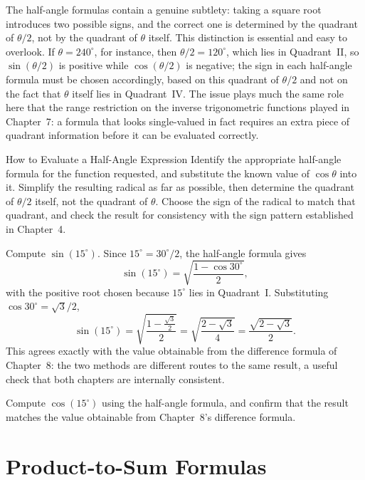 The half-angle formulas contain a genuine subtlety: taking a square root
introduces two possible signs, and the correct one is determined by the
quadrant of $\theta/2$, not by the quadrant of $\theta$ itself. This
distinction is essential and easy to overlook. If $\theta = 240^\circ$,
for instance, then $\theta/2 = 120^\circ$, which lies in Quadrant~II, so
$\sin(\theta/2)$ is positive while $\cos(\theta/2)$ is negative; the sign
in each half-angle formula must be chosen accordingly, based on this
quadrant of $\theta/2$ and not on the fact that $\theta$ itself lies in
Quadrant~IV. The issue plays much the same role here that the range
restriction on the inverse trigonometric functions played in Chapter~7:
a formula that looks single-valued in fact requires an extra piece of
quadrant information before it can be evaluated correctly.

\begin{algorithmproc}{How to Evaluate a Half-Angle Expression}
Identify the appropriate half-angle formula for the function requested,
and substitute the known value of $\cos\theta$ into it. Simplify the
resulting radical as far as possible, then determine the quadrant of
$\theta/2$ itself, not the quadrant of $\theta$. Choose the sign of the
radical to match that quadrant, and check the result for consistency with
the sign pattern established in Chapter~4.
\end{algorithmproc}

\begin{example}
Compute $\sin(15^\circ)$. Since $15^\circ = 30^\circ/2$, the half-angle
formula gives
\[
\sin(15^\circ) = \sqrt{\frac{1-\cos30^\circ}{2}},
\]
with the positive root chosen because $15^\circ$ lies in Quadrant~I.
Substituting $\cos30^\circ = \sqrt3/2$,
\[
\sin(15^\circ) = \sqrt{\frac{1-\frac{\sqrt3}{2}}{2}} = \sqrt{\frac{2-\sqrt3}{4}} = \frac{\sqrt{2-\sqrt3}}{2}.
\]
This agrees exactly with the value obtainable from the difference formula
of Chapter~8: the two methods are different routes to the same result, a
useful check that both chapters are internally consistent.
\end{example}

\begin{practicenow}
Compute $\cos(15^\circ)$ using the half-angle formula, and confirm that the
result matches the value obtainable from Chapter~8's difference formula.
\end{practicenow}

\section{Product-to-Sum Formulas}

